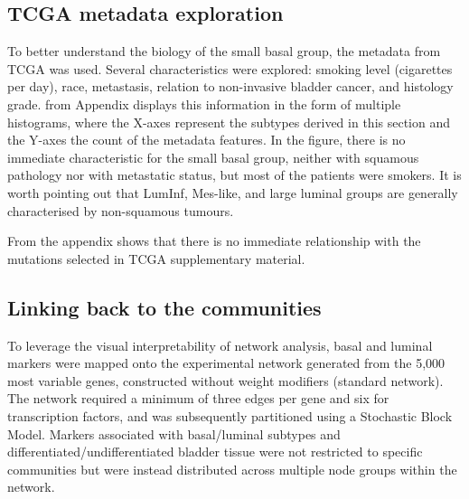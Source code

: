 \newpage

\subsection{TCGA metadata exploration} \label{s:N_I:sel_tfs_metadata}

To better understand the biology of the small basal group, the metadata from TCGA \citep{Cancer_Genome_Atlas_Research_Network2014-xp} was used. Several characteristics were explored: smoking level (cigarettes per day), race, metastasis, relation to non-invasive bladder cancer, and histology grade.  from Appendix displays this information in the form of multiple histograms, where the X-axes represent the subtypes derived in this section and the Y-axes the count of the metadata features. In the figure, there is no immediate characteristic for the small basal group, neither with squamous pathology nor with metastatic status, but most of the patients were smokers. It is worth pointing out that LumInf, Mes-like, and large luminal groups are generally characterised by non-squamous tumours. 

From the appendix  shows that there is no immediate relationship with the mutations selected in TCGA supplementary material.


\subsection{Linking back to the communities} \label{s:N_I:sel_tfs_net}

To leverage the visual interpretability of network analysis, basal and luminal markers were mapped onto the experimental network generated from the 5,000 most variable genes, constructed without weight modifiers (standard network). The network required a minimum of three edges per gene and six for transcription factors, and was subsequently partitioned using a Stochastic Block Model. Markers associated with basal/luminal subtypes and differentiated/undifferentiated bladder tissue were not restricted to specific communities but were instead distributed across multiple node groups within the network.


